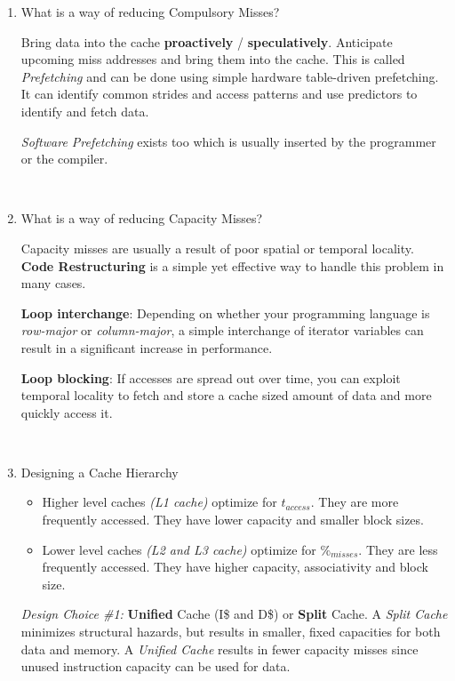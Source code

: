 \documentclass[12pt]{article}
\newenvironment{QandA}{\begin{enumerate}[label=\bfseries\arabic*.]\bfseries}
                      {\end{enumerate}}
\newenvironment{answered}{\par\quad\normalfont}{}
\begin{document}
\begin{QandA}
\

\item What is a way of reducing Compulsory Misses?
\begin{answered}
Bring data into the cache \textbf{proactively} / \textbf{speculatively}. Anticipate upcoming miss addresses and bring them into the cache. This is called \textit{Prefetching} and can be done using simple hardware table-driven prefetching. It can identify common strides and access patterns and use predictors to identify and fetch data. 

\textit{Software Prefetching} exists too which is usually inserted by the programmer or the compiler.
\end{answered}

\ 

\item What is a way of reducing Capacity Misses?
\begin{answered}
Capacity misses are usually a result of poor spatial or temporal locality. \textbf{Code Restructuring} is a simple yet effective way to handle this problem in many cases.

\textbf{Loop interchange}: Depending on whether your programming language is \textit{row-major} or \textit{column-major}, a simple interchange of iterator variables can result in a significant increase in performance.

\textbf{Loop blocking}: If accesses are spread out over time, you can exploit temporal locality to fetch and store a cache sized amount of data and more quickly access it. 
\end{answered}

\ 

\item Designing a Cache Hierarchy
\begin{answered}
\vspace{-0.85cm}
\begin{itemize}
    \item Higher level caches \textit{(L1 cache)} optimize for $t_{access}$. They are more frequently accessed. They have lower capacity and smaller block sizes.
    \item Lower level caches \textit{(L2 and L3 cache)} optimize for $\%_{misses}$. They are less frequently accessed. They have higher capacity, associativity and block size.
\end{itemize}

\textit{Design Choice \#1:} \textbf{Unified} Cache (I\$ and D\$) or \textbf{Split} Cache. A \textit{Split Cache} minimizes structural hazards, but results in smaller, fixed capacities for both data and memory. A \textit{Unified Cache} results in fewer capacity misses since unused instruction capacity can be used for data. 


\end{answered}
\end{QandA}
\end{document}
